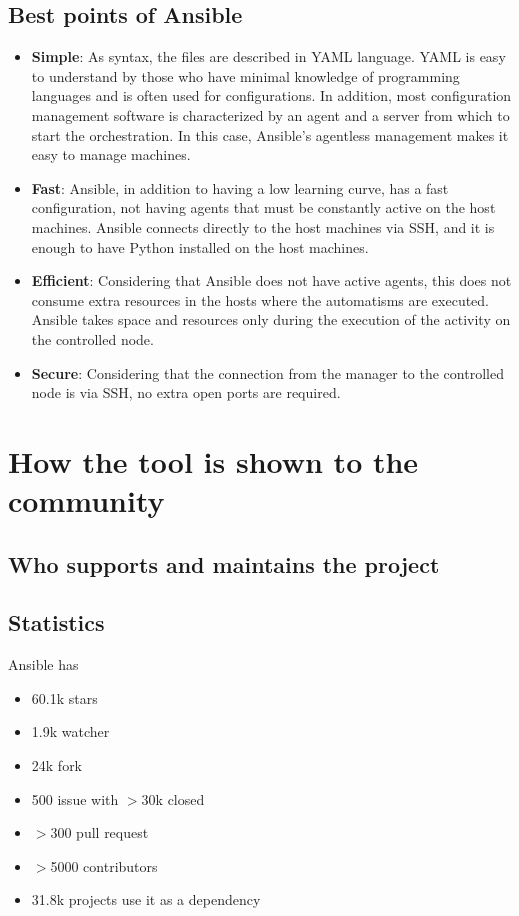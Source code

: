 \documentclass[12pt,a4paper,openright,twoside]{book}
\begin{document}
\subsection{Best points of Ansible}
\begin{itemize}
    \item \textbf{Simple}: As syntax, the files are described in YAML language. YAML is easy to understand by those who have minimal knowledge of programming languages and is often used for configurations. In addition, most configuration management software is characterized by an agent and a server from which to start the orchestration. In this case, Ansible's agentless management makes it easy to manage machines.
    \item \textbf{Fast}: Ansible, in addition to having a low learning curve, has a fast configuration, not having agents that must be constantly active on the host machines. Ansible connects directly to the host machines via SSH, and it is enough to have Python installed on the host machines.
    \item \textbf{Efficient}: Considering that Ansible does not have active agents, this does not consume extra resources in the hosts where the automatisms are executed. Ansible takes space and resources only during the execution of the activity on the controlled node.
    \item \textbf{Secure}: Considering that the connection from the manager to the controlled node is via SSH, no extra open ports are required.
\end{itemize}

\section{How the tool is shown to the community}

\subsection{Who supports and maintains the project}

\subsection{Statistics}
Ansible has 
\begin{itemize}
    \item 60.1k stars
    \item 1.9k watcher
    \item 24k fork
    \item 500 issue with $>$30k closed
    \item $>$300 pull request
    \item $>$5000 contributors
    \item 31.8k projects use it as a dependency
\end{itemize}
\end{document}
